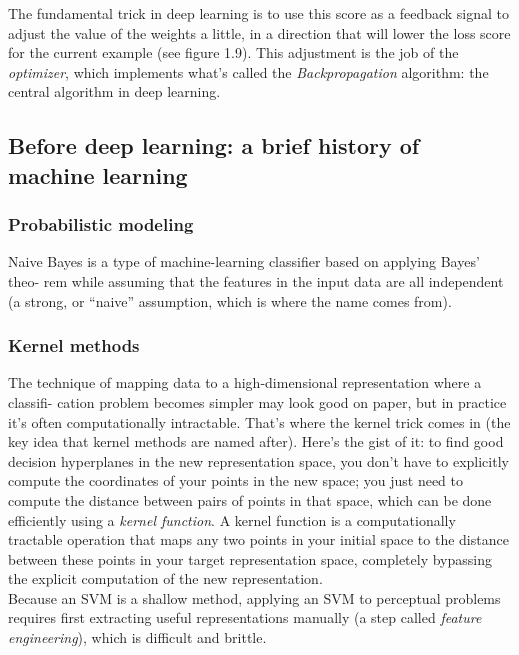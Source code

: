 \documentclass{article}
\numberwithin{equation}{section} %
\begin{document}
The fundamental trick in deep learning is to use this score as a feedback signal to
adjust the value of the weights a little, in a direction that will lower the loss score for the current example (see figure 1.9). This adjustment is the job of the \textit{optimizer}, which implements what’s called the \textit{Backpropagation} algorithm: the central algorithm in deep learning. \\

\subsection{Before deep learning: a brief history of machine learning}

\subsubsection{Probabilistic modeling}

Naive Bayes is a type of machine-learning classifier based on applying Bayes’ theo-
rem while assuming that the features in the input data are all independent (a strong, or “naive” assumption, which is where the name comes from). \\

\subsubsection{Kernel methods}

The technique of mapping data to a high-dimensional representation where a classifi-
cation problem becomes simpler may look good on paper, but in practice it’s often computationally intractable. That’s where the kernel trick comes in (the key idea
that kernel methods are named after). Here’s the gist of it: to find good decision
hyperplanes in the new representation space, you don’t have to explicitly compute
the coordinates of your points in the new space; you just need to compute the distance between pairs of points in that space, which can be done efficiently using a \textit{kernel function}. A kernel function is a computationally tractable operation that maps any two points in your initial space to the distance between these points in your target representation space, completely bypassing the explicit computation of the new representation. \\

Because an SVM is a shallow method, applying an SVM to perceptual problems requires first extracting useful representations manually (a step called \textit{feature engineering}), which is difficult and brittle. \\
\end{document}
